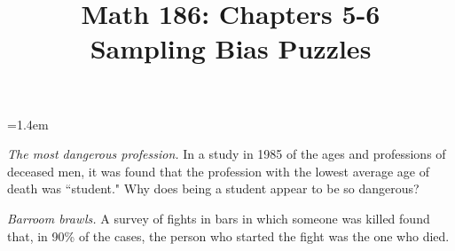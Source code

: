 \documentclass[12pt]{amsart}
\title{Math 186: Chapters 5-6\\ Sampling Bias Puzzles}
\begin{document}
\maketitle



\begin{list}
{}
{\leftmargin=1.4em}



\item \textsl{The most dangerous profession.} In a study in 1985 of the ages and professions of deceased men, it was found that the profession with the lowest average age of death was ``student." Why does being a student appear to be so dangerous?

\vspace{2in}

\item \textsl{Barroom brawls.} A survey of fights in bars in which someone was killed found that, in 90\% of the cases, the person who started the fight was the one who died.


\end{list}
\end{document}
